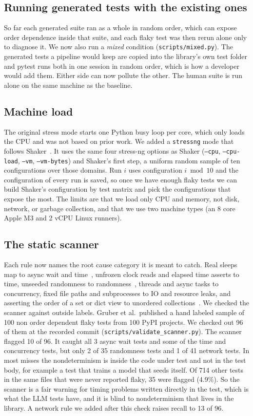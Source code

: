 \documentclass[sigconf,nonacm]{acmart}
\begin{document}
\subsection{Running generated tests with the existing ones}
So far each generated suite ran as a whole in random order, which can expose order dependence inside that suite, and each flaky test was then rerun alone only to diagnose it. We now also run a \emph{mixed} condition (\texttt{scripts/mixed.py}). The generated tests a pipeline would keep are copied into the library's own test folder and pytest runs both in one session in random order, which is how a developer would add them. Either side can now pollute the other. The human suite is run alone on the same machine as the baseline.

\subsection{Machine load}
The original stress mode starts one Python busy loop per core, which only loads the CPU and was not based on prior work. We added a \texttt{stressng} mode that follows Shaker~\cite{silva2020}. It uses the same four stress-ng options as Shaker (\texttt{--cpu}, \texttt{--cpu-load}, \texttt{--vm}, \texttt{--vm-bytes}) and Shaker's first step, a uniform random sample of ten configurations over those domains. Run $i$ uses configuration $i \bmod 10$ and the configuration of every run is saved, so once we have enough flaky tests we can build Shaker's configuration by test matrix and pick the configurations that expose the most. The limits are that we load only CPU and memory, not disk, network, or garbage collection, and that we use two machine types (an 8 core Apple M3 and 2 vCPU Linux runners).

\subsection{The static scanner}
\label{sec:rq3}
Each rule now names the root cause category it is meant to catch. Real sleeps map to async wait and time~\cite{luo2014}, unfrozen clock reads and elapsed time asserts to time, unseeded randomness to randomness~\cite{gruber2021}, threads and async tasks to concurrency, fixed file paths and subprocesses to IO and resource leaks, and asserting the order of a set or dict view to unordered collections~\cite{luo2014,gyori2016}. We checked the scanner against outside labels. Gruber et al.\ published a hand labeled sample of 100 non order dependent flaky tests from 100 PyPI projects. We checked out 96 of them at the recorded commit (\texttt{scripts/validate\_scanner.py}). The scanner flagged 10 of 96. It caught all 3 async wait tests and some of the time and concurrency tests, but only 2 of 35 randomness tests and 1 of 41 network tests. In most misses the nondeterminism is inside the code under test and not in the test body, for example a test that trains a model that seeds itself. Of 714 other tests in the same files that were never reported flaky, 35 were flagged (4.9\%). So the scanner is a fair warning for timing problems written directly in the test, which is what the LLM tests have, and it is blind to nondeterminism that lives in the library. A network rule we added after this check raises recall to 13 of 96.
\end{document}
